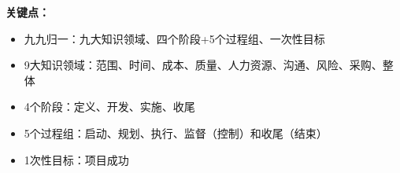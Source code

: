 \textbf{关键点：}
\begin{itemize}
	\item 九九归一：九大知识领域、四个阶段+5个过程组、一次性目标
	\item 9大知识领域：范围、时间、成本、质量、人力资源、沟通、风险、采购、整体
	\item 4个阶段：定义、开发、实施、收尾
	\item 5个过程组：启动、规划、执行、监督（控制）和收尾（结束）
	\item 1次性目标：项目成功
\end{itemize}